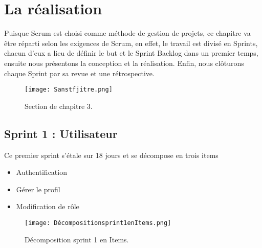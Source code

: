 \chapter{La réalisation }
\label{sec:conception}

\begin{fquote}Puisque Scrum est choisi comme méthode de gestion de projets, ce chapitre va être réparti selon
	les exigences de Scrum, en effet, le travail est divisé en Sprints, chacun d’eux a lieu de définir le but
	et le Sprint Backlog dans un premier temps, ensuite nous présentons la conception et la réalisation.
	Enfin, nous clôturons chaque Sprint par sa revue et une rétrospective.
 \end{fquote}
\begin{figure}[ht]
	\centering
	\texttt{[image: Sanstfjitre.png]}
	\caption{Section de chapitre 3.}
	\label{fig:Section de chapitre 3}
\end{figure}
\FloatBarrier
\clearpage

\section{Sprint 1 : Utilisateur }
\label{sec:conception}

\begin{fquote}
Ce premier sprint s’étale sur 18 jours et se décompose en trois items  \end{fquote}
\smallskip
\begin{itemize}[label=$\diamond$]
	\item Authentification
	\item Gérer le profil
	\item Modification de rôle
\end{itemize}
\medskip
\medskip
\medskip
\medskip
\medskip
\medskip
\medskip
\medskip
\medskip
\medskip
\begin{figure}[ht]
	\centering
	\texttt{[image: Décompositionsprint1enItems.png]}
	\caption{Décomposition sprint 1 en Items.}
	\label{fig:Décomposition sprint 1 en Items}
\end{figure}
\FloatBarrier
\clearpage

